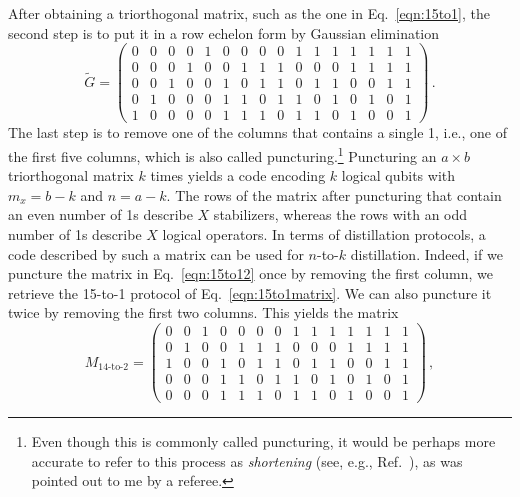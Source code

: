 \documentclass[prx,aps,letterpaper,twocolumn,allowfontchageintitle=true,accepted=2019-02-01]{quantumarticle}
\begin{document}
After obtaining a triorthogonal matrix, such as the one in Eq.~\eqref{eqn:15to1}, the second step is to put it in a row echelon form by Gaussian elimination
\begin{equation}
\tilde{G} = 
\begin{pmatrix}
 0 & 0 & 0 & 0 & 1 & 0 & 0 & 0 & 0 & 1 & 1 & 1 & 1 & 1 & 1 & 1 \\
 0 & 0 & 0 & 1 & 0 & 0 & 1 & 1 & 1 & 0 & 0 & 0 & 1 & 1 & 1 & 1 \\
 0 & 0 & 1 & 0 & 0 & 1 & 0 & 1 & 1 & 0 & 1 & 1 & 0 & 0 & 1 & 1 \\
 0 & 1 & 0 & 0 & 0 & 1 & 1 & 0 & 1 & 1 & 0 & 1 & 0 & 1 & 0 & 1 \\
 1 & 0 & 0 & 0 & 0 & 1 & 1 & 1 & 0 & 1 & 1 & 0 & 1 & 0 & 0 & 1 
\end{pmatrix} \, .
\label{eqn:15to12}
\end{equation}
The last step is to remove one of the columns that contains a single 1, i.e., one of the first five columns, which is also called puncturing.\footnote{Even though this is commonly called puncturing, it would be perhaps more accurate to refer to this process as \emph{shortening} (see, e.g., Ref.~\cite{ModifyingCodes}), as was pointed out to me by a referee.} Puncturing an $a \times b$ triorthogonal matrix $k$ times yields a code encoding $k$ logical qubits with $m_x = b-k$ and $n=a-k$. The rows of the matrix after puncturing that contain an even number of 1s describe $X$ stabilizers, whereas the rows with an odd number of 1s describe $X$ logical operators.
In terms of distillation protocols, a code described by such a matrix can be used for $n$-to-$k$ distillation. Indeed, if we puncture the matrix in Eq.~\eqref{eqn:15to12} once by removing the first column, we retrieve the 15-to-1 protocol of Eq.~\eqref{eqn:15to1matrix}. We can also puncture it twice by removing the first two columns. This yields the matrix
\begin{equation}
M_{\text{14-to-2}} = 
\begin{pmatrix}
 0 & 0 & 1 & 0 & 0 & 0 & 0 & 1 & 1 & 1 & 1 & 1 & 1 & 1 \\
 0 & 1 & 0 & 0 & 1 & 1 & 1 & 0 & 0 & 0 & 1 & 1 & 1 & 1 \\
 1 & 0 & 0 & 1 & 0 & 1 & 1 & 0 & 1 & 1 & 0 & 0 & 1 & 1 \\
 \hline
 0 & 0 & 0 & 1 & 1 & 0 & 1 & 1 & 0 & 1 & 0 & 1 & 0 & 1 \\
 0 & 0 & 0 & 1 & 1 & 1 & 0 & 1 & 1 & 0 & 1 & 0 & 0 & 1
\end{pmatrix} \, ,
\label{eqn:14to2}
\end{equation}
\end{document}
